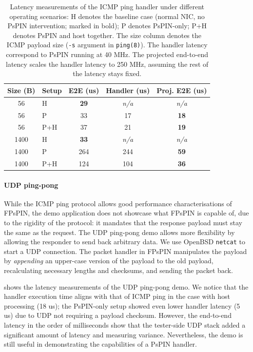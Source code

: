 \begin{table}[!ht]
    \centering
    \begin{tabular}{clccc}
    \toprule
    Size (B) & Setup & E2E (us) & Handler (us) & Proj. E2E (us) \\ \midrule
    56 & H & \textbf{29} & \emph{n/a} & \emph{n/a} \\
    56 & P & 33 & 17 & {\color{acmgreen}\textbf{18}} \\
    56 & P+H & 37 & 21 & {\color{acmgreen}\textbf{19}} \\ \midrule
    1400 & H & \textbf{33} & \emph{n/a} & \emph{n/a} \\
    1400 & P & 264 & 244 & {\color{acmyellow}\textbf{59}} \\
    1400 & P+H & 124 & 104 & {\color{acmyellow}\textbf{36}}\\
    \bottomrule
    \end{tabular}
    \caption{Latency measurements of the ICMP ping handler under different operating scenarios: H denotes the baseline case (normal NIC, no PsPIN intervention; marked in bold); P denotes PsPIN-only; P+H denotes PsPIN and host together.  The size column denotes the ICMP payload size (\texttt{-s} argument in \texttt{ping(8)}).  The handler latency correspond to PsPIN running at 40 MHz.  The projected end-to-end latency scales the handler latency to 250 MHz, assuming the rest of the latency stays fixed.}
    \label{tab:icmp-ping}
\end{table}

\paragraph{UDP ping-pong} While the ICMP ping protocol allows good performance characterisations of FPsPIN, the demo application does not showcase what FPsPIN is capable of, due to the rigidity of the protocol: it mandates that the response payload must stay the same as the request.  The UDP ping-pong demo allows more flexibility by allowing the responder to send back arbitrary data.  We use OpenBSD \texttt{netcat} to start a UDP connection.  The packet handler in FPsPIN manipulates the payload by \emph{appending} an upper-case version of the payload to the old payload, recalculating necessary lengths and checksums, and sending the packet back.

 shows the latency measurements of the UDP ping-pong demo.  We notice that the handler execution time aligns with that of ICMP ping in the case with host processing (18 us); the PsPIN-only setup showed even lower handler latency (5 us) due to UDP not requiring a payload checksum.  However, the end-to-end latency in the order of milliseconds show that the tester-side UDP stack added a significant amount of latency and measuring variance.  Nevertheless, the demo is still useful in demonstrating the capabilities of a PsPIN handler.

